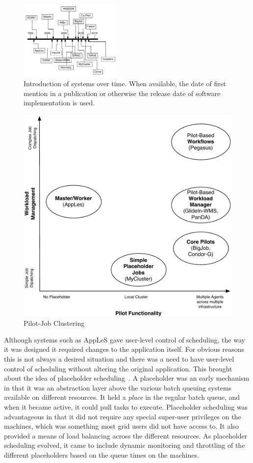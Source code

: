 \documentclass{sig-alternate}
\begin{document}
%
%
\begin{figure}[t]
  \centering
    \includegraphics[width=0.45\textwidth]{figures/timeline}
    \caption{Introduction of systems over time. When available, the date of
    first mention in a publication or otherwise the release date of software
    implementation is used.}
    \label{fig:timeline}
\end{figure}

\begin{figure}[t]
	\centering
		\includegraphics[width=.45\textwidth]{figures/pilotjob-clustering.pdf}
	\caption{Pilot-Job Clustering}
	\label{fig:pilotjob_clustering}
\end{figure}


Although systems such as AppLeS gave user-level control of scheduling, the way
it was designed it required changes to the application itself. For obvious
reasons this is not always a desired situation and there was a need to have
user-level control of scheduling without altering the original application.
This brought about the idea of placeholder
scheduling~\cite{Pinchak02practicalheterogeneous}. A placeholder was an early
\pilot mechanism in that it was an abstraction layer above the various batch
queuing systems available on different resources. It held a \textit{place} in
the regular batch queue, and when it became active, it could pull tasks to
execute.  Placeholder scheduling was advantageous in that it did not require
any special super-user privileges on the machines, which was something most
grid users did not have access to.  It also provided a means of load balancing
across the different resources.  As placeholder scheduling evolved, it came to
include dynamic monitoring and throttling of the different placeholders based
on the queue times on the machines.
\end{document}
